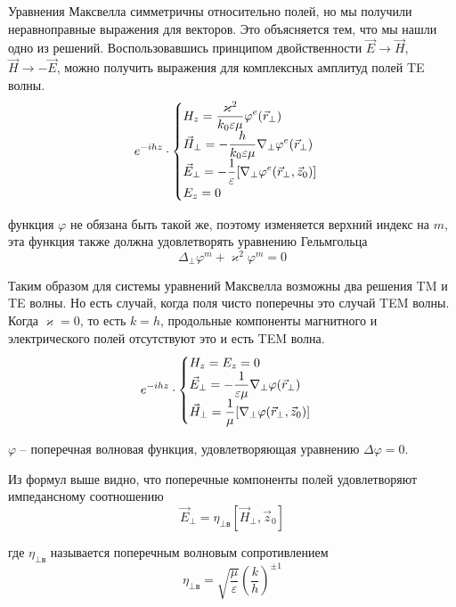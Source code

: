 \documentclass[a4paper,14pt]{extarticle}
\renewcommand{\phi}{\varphi}
\renewcommand{\epsilon}{\varepsilon}
\renewcommand{\kappa}{\varkappa}
\begin{document}
	Уравнения Максвелла симметричны относительно полей, но мы получили неравноправные выражения для векторов. Это объясняется тем, что мы нашли одно из решений. Воспользовавшись принципом двойственности $\vec{E}\to\vec{H}$, $\vec{H}\to -\vec{E}$, можно получить выражения  для комплексных амплитуд полей TE волны. 
	\begin{displaymath}
	e^{-ihz}\cdot
	\begin{cases}
	$$\displaystyle H_z = \frac{\kappa^2}{k_0\epsilon\mu}\phi^e(\vec{r}_\perp)$$ \\
	$$\displaystyle\vec{H}_\perp = -\frac{h}{k_0\epsilon\mu}\nabla_\perp\phi^e(\vec{r}_\perp)$$ \\
	$$\displaystyle\vec{E}_\perp = -\frac{1}{\epsilon}[\nabla_\perp\phi^e(\vec{r}_\perp,\vec{z}_0)]$$ \\
	$$\displaystyle E_z = 0$$
	\end{cases}
	\end{displaymath}
	
	функция $\phi$ не обязана быть такой же, поэтому изменяется верхний индекс на $m$, эта функция также должна удовлетворять уравнению Гельмгольца  
	$$\Delta_\perp\phi^{m} + \kappa^2\phi^{m}=0$$
	
	Таким образом для системы уравнений Максвелла возможны два решения TM и TE волны. Но есть случай, когда поля чисто поперечны это случай TEM волны.
	Когда $\kappa = 0$, то есть $k=h$, продольные компоненты магнитного и электрического полей отсутствуют это и есть TEM волна.
	\begin{displaymath}
	e^{-ihz}\cdot
	\begin{cases}
	$$\displaystyle H_z = E_z = 0$$ \\
	$$\displaystyle\vec{E}_\perp = -\frac{1}{\epsilon\mu}\nabla_\perp\phi(\vec{r}_\perp)$$ \\
	$$\displaystyle\vec{H}_\perp = \frac{1}{\mu}[\nabla_\perp\phi(\vec{r}_\perp,\vec{z}_0)]$$ 
	\end{cases}
	\end{displaymath}
	
	$\phi$ -- поперечная волновая функция, удовлетворяющая уравнению $\Delta\phi=0$.
	
	Из формул выше видно, что поперечные компоненты полей удовлетворяют импедансному соотношению
	$$\vec{E}_\perp = \eta_{\perp\text{в}}[\vec{H}_\perp,\vec{z}_0]$$
	
	где $\eta_{\perp\text{в}}$ называется поперечным волновым сопротивлением
	$$\eta_{\perp\text{в}}=\sqrt{\frac{\mu}{\epsilon}} \left( \frac{k}{h} \right)^{\pm 1}$$ 
	
\end{document}
